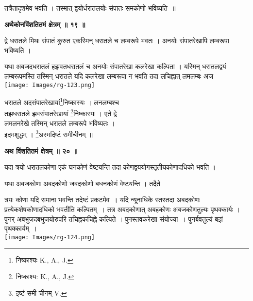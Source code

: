 \documentclass[11pt, openany]{book}
\begin{document}
\noindent तत्रैतादृशमेव भवति । तस्मात् द्वयोर्धरातलयोः संपातः समकोणो भविष्यति~॥

\newpage
\begin{center}
\textbf{\large अथैकोनविंशतितमं क्षेत्रम् ॥ १९ ॥}
\end{center}
\vspace{5mm}

{\ab द्वे धरातले मिथः संपातं कुरुत एकस्मिन् धरातले च
लम्बरूपे भवतः । अनयोः संपातरेखापि लम्बरूपा भविष्यति ।}\\
\vspace{5mm}

\begin{vwcol}[widths={0.7,0.3}, sep=.8cm, rule=0pt]
यथा अबजदधरातलं हझवतधरातलं च अनयोः संपातरेखा
कलरेखा कल्पिता । यस्मिन् धरातलद्वयं लम्बरूपमस्ति तस्मिन् धरातले यदि कलरेखा लम्बरूपा न भवति तदा लचिह्नात् लमलम्बः अज \\
\noindent \texttt{[image: Images/rg-123.png]}
\end{vwcol}
\vspace{-11mm}

\noindent धरातले  अदसंपातरेखायां\renewcommand{\thefootnote}{१}\footnote{निष्काश्यः {\en K., A., J.} }निष्कास्यः । लनलम्बश्च \\
तझधरातले झवसंपातरेखायां \renewcommand{\thefootnote}{२}\footnote{निष्काश्य: {\en K., A., J.} }निष्कास्यः । एते द्वे \\
लमलनरेखे तस्मिन् धरातले लम्बरूपे भविष्यतः ।\\ इदमशुद्धम् ।
\renewcommand{\thefootnote}{३}\footnote{इष्टं समी चीनम् {\en V.}}अस्मदिष्टं समीचीनम् ॥\\
\begin{center}
 \textbf{\large अथ विंशतितमं क्षेत्रम् ॥ २० ॥}
\end{center}
\vspace{5mm}

{\ab यदा त्रयो धरातलकोणा एकं घनकोणं वेष्टयन्ति तदा
कोणद्वययोगस्तृतीयकोणादधिको भवति ।}\\
\vspace{5mm}

 यथा अबजकोणः अबदकोणो जबदकोणो बधनकोणं वेष्टयन्ति । तदैते 
 \begin{vwcol}[widths={0.65,0.35}, sep=.8cm, rule=0pt]
त्रयः कोणा यदि समाना भवन्ति तदेष्टं प्रकटमेव~। यदि न्यूनाधिके स्तस्तदा अबदकोणः\\ \noindent प्रत्येकशेषकोणादधिको भवतीति कल्पितम्~। तत्र अबदकोणात् अबहकोणः अबजकोणतुल्यः पृथक्कार्यः । पुनर् अबभुजदबभुजयोरुपरि तचिह्नकचिह्ने कल्पिते ।  पुनस्तवकरेखा संयोज्या~। पुनर्बवतुल्यं बझं पृथक्कार्यम्~।\\
\noindent \texttt{[image: Images/rg-124.png]}
\end{vwcol}
\end{document}
